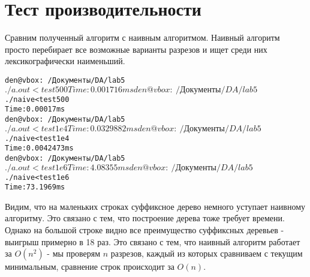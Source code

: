 \section{Тест производительности}
Сравним полученный алгоритм с наивным алгоритмом. Наивный алгоритм просто
перебирает все возможные варианты разрезов и ищет среди них лексикографически
наименьший.\newline

\begin{alltt}
den@vbox:~/Документы/DA/lab5$ ./a.out <test500
Time: 0.001716 ms
den@vbox:~/Документы/DA/lab5$ ./naive <test500
Time: 0.00017 ms
den@vbox:~/Документы/DA/lab5$ ./a.out <test1e4
Time: 0.0329882 ms
den@vbox:~/Документы/DA/lab5$ ./naive <test1e4
Time: 0.0042473 ms
den@vbox:~/Документы/DA/lab5$ ./a.out <test1e6
Time: 4.08355 ms
den@vbox:~/Документы/DA/lab5$ ./naive <test1e6
Time: 73.1969 ms
\end{alltt}

Видим, что на маленьких строках суффиксное дерево немного уступает наивному
алгоритму. Это связано с тем, что построение дерева тоже требует времени. Однако на большой строке видно все преимущество суффиксных деревьев - выигрыш
примерно в 18 раз. Это связано с тем, что наивный алгоритм работает за $O(n^2)$ -
мы проверям $n$ разрезов, каждый из которых сравниваем с текущим минимальным, сравнение строк происходит за $O(n)$.\newline

\pagebreak